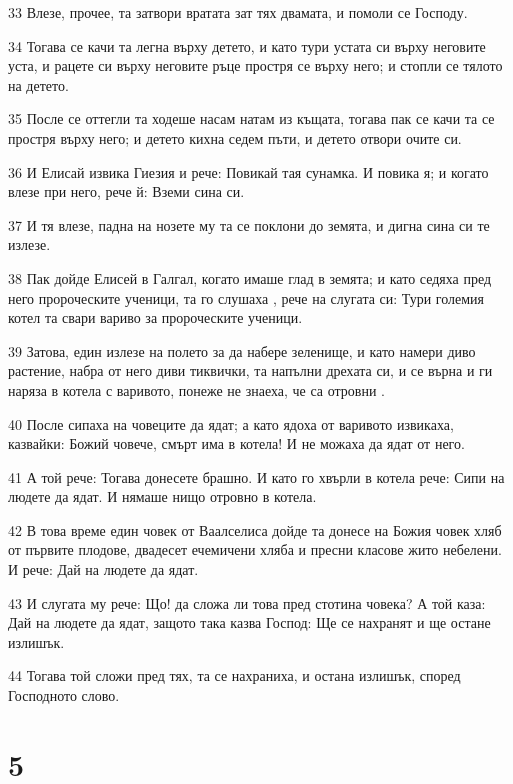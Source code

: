 \par 33 Влезе, прочее, та затвори вратата зат тях двамата, и помоли се Господу.
\par 34 Тогава се качи та легна върху детето, и като тури устата си върху неговите уста, и рацете си върху неговите ръце простря се върху него; и стопли се тялото на детето.
\par 35 После се оттегли та ходеше насам натам из къщата, тогава пак се качи та се простря върху него; и детето кихна седем пъти, и детето отвори очите си.
\par 36 И Елисай извика Гиезия и рече: Повикай тая сунамка. И повика я; и когато влезе при него, рече й: Вземи сина си.
\par 37 И тя влезе, падна на нозете му та се поклони до земята, и дигна сина си те излезе.
\par 38 Пак дойде Елисей в Галгал, когато имаше глад в земята; и като седяха пред него пророческите ученици, та го слушаха , рече на слугата си: Тури големия котел та свари вариво за пророческите ученици.
\par 39 Затова, един излезе на полето за да набере зеленище, и като намери диво растение, набра от него диви тиквички, та напълни дрехата си, и се върна и ги наряза в котела с варивото, понеже не знаеха, че са отровни .
\par 40 После сипаха на човеците да ядат; а като ядоха от варивото извикаха, казвайки: Божий човече, смърт има в котела! И не можаха да ядат от него.
\par 41 А той рече: Тогава донесете брашно. И като го хвърли в котела рече: Сипи на людете да ядат. И нямаше нищо отровно в котела.
\par 42 В това време един човек от Ваалселиса дойде та донесе на Божия човек хляб от първите плодове, двадесет ечемичени хляба и пресни класове жито небелени. И рече: Дай на людете да ядат.
\par 43 И слугата му рече: Що! да сложа ли това пред стотина човека? А той каза: Дай на людете да ядат, защото така казва Господ: Ще се нахранят и ще остане излишък.
\par 44 Тогава той сложи пред тях, та се нахраниха, и остана излишък, според Господното слово.

\chapter{5}

